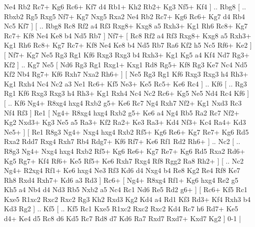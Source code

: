 Ne4 Rb2  Rc7+ Kg6  Rc6+ Kf7  d4 Rb1+  Kh2 Rb2+  Kg3 Nf5+  Kf4   ] .. Rbg8 [ .. Rbxb2  Rg5 Rxg5  Nf7+ Kg7  Nxg5 Rxa2  Ne4 Rb2  Rc7+ Kg6  Rc6+ Kg7  d4 Rb4  Nc5 Kf7   ]  [ .. Rbg8  Rc8 Rf2  a4 Rf3  Rxg8+ Kxg8  a5 Rxh3+  Kg1 Rh6  Rc8+ Kg7  Rc7+ Kf8  Ne4 Ke8  b4 Nd5  Rb7   ]  Nf7+ [  Rc8 Rf2  a4 Rf3  Rxg8+ Kxg8  a5 Rxh3+  Kg1 Rh6  Rc8+ Kg7  Rc7+ Kf8  Ne4 Ke8  b4 Nd5  Rb7 Ra6  Kf2 h5  Nc5 Rf6+  Ke2   ]  [  Nf7+ Kg7  Ne5 Rg3  Rg1 Kf6  Rxg3 Rxg3  b4 Rxh3+  Kg1 Kg5  a4 Kf4  Nd7 Rg3+  Kf2   ] .. Kg7   Ne5 [  Nd6 Rg3  Rg1 Rxg1+  Kxg1 Rd8  Rg5+ Kf8  Rg3 Ke7  Nc4 Nd5  Kf2 Nb4  Rg7+ Kf6  Rxh7 Nxa2  Rh6+   ]  [  Ne5 Rg3  Rg1 Kf6  Rxg3 Rxg3  h4 Rh3+  Kg1 Rxh4  Nc4 Nc2  a3 Ne1  Rc6+ Kf5  Ne3+ Ke5  Rc5+ Ke6  Rc4   ] .. Kf6 [ .. Rg3  Rg1 Kf6  Rxg3 Rxg3  h4 Rh3+  Kg1 Rxh4  Nc4 Nc2  Rc6+ Kg5  Ne5 Nd4  Rc4 Kf6   ]  [ .. Kf6  Ng4+ R8xg4  hxg4 Rxb2  g5+ Ke6  Rc7 Ng4  Rxh7 Nf2+  Kg1 Nxd3  Rc3 Nf4  Rf3   ]  Re1 [  Ng4+ R8xg4  hxg4 Rxb2  g5+ Ke6  a4 Ng4  Rb5 Ra2  Rc7 Nf2+  Kg2 Nxd3+  Kg3 Ne5  a5 Ra3+  Kf2 Ra2+  Ke3 Ra3+  Kd4 Nf3+  Kc4 Ra4+  Kd3 Ne5+   ]  [  Re1 R8g3  Ng4+ Nxg4  hxg4 Rxb2  Rf5+ Kg6  Re6+ Kg7  Re7+ Kg6  Rd5 Rxa2  Rdd7 Rxg4  Rxh7 Rb4  Rdg7+ Kf6  Rf7+ Ke6  Rf1 Rd2  Rh6+   ] .. Nc2 [ .. R8g3  Ng4+ Nxg4  hxg4 Rxb2  Rf5+ Kg6  Re6+ Kg7  Re7+ Kg6  Rd5 Rxa2  Rd6+ Kg5  Rg7+ Kf4  Rf6+ Ke5  Rf5+ Ke6  Rxh7 Rxg4  Rf8 Rgg2  Ra8 Rh2+   ]  [ .. Nc2  Ng4+ R2xg4  Rf1+ Ke6  hxg4 Ne3  Rf3 Kd6  d4 Nxg4  b4 Re8  Kg2 Re4  Rf8 Ke7  Rh8 Rxd4  Rxh7+ Kd6  a3 Rd3   ]  Rc6+ [  Ng4+ R8xg4  Rf1+ Kg6  hxg4 Re2  g5 Kh5  a4 Nb4  d4 Nd3  Rb5 Nxb2  a5 Nc4  Rc1 Nd6  Re5 Rd2  g6+   ]  [  Rc6+ Kf5  Rc1 Kxe5  R1xc2 Rxc2  Rxc2 Rg3  Kh2 Rxd3  Kg2 Kd4  a4 Rd1  Kf3 Rd3+  Kf4 Rxh3  b4 Kd3  Rg2   ] .. Kf5    [ .. Kf5  Rc1 Kxe5  R1xc2 Rxc2  Rxc2 Kd4  Rc7 h6  Rd7+ Ke5  d4+ Ke4  d5 Rc8  d6 Kd5  Rc7 Rd8  d7 Kd6  Ra7 Rxd7  Rxd7+ Kxd7  Kg2   ] 0-1  |
